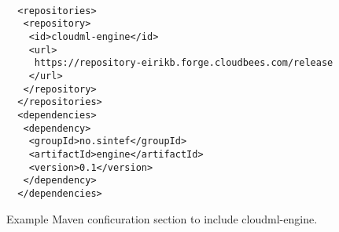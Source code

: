 \begin{figure}[tb]
  \begin{center}
    \begin{verbatim}

  <repositories>
   <repository>
    <id>cloudml-engine</id>
    <url>
     https://repository-eirikb.forge.cloudbees.com/release
    </url>
   </repository>
  </repositories>
  <dependencies>
   <dependency>
    <groupId>no.sintef</groupId>
    <artifactId>engine</artifactId>
    <version>0.1</version>
   </dependency>
  </dependencies>
    \end{verbatim}
  \end{center}
  \caption{Example Maven conficuration section to include cloudml-engine.}
  \label{fig:pom-example}
\end{figure}

